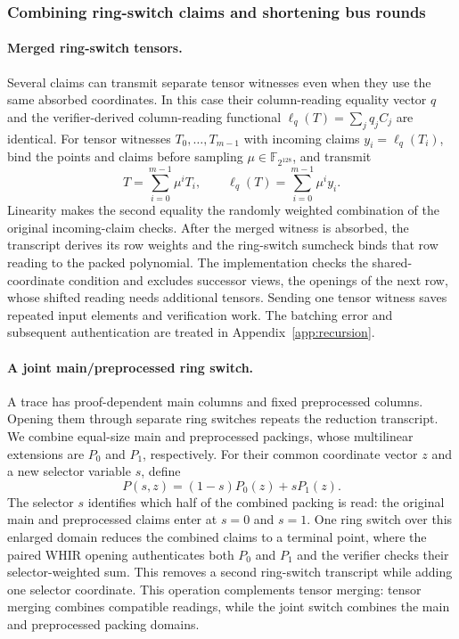 \documentclass[11pt]{article}
\newcommand{\F}{\mathbb{F}_{2^{128}}}
\begin{document}
\subsubsection{Combining ring-switch claims and shortening bus rounds}

\paragraph{Merged ring-switch tensors.} Several claims can transmit separate
tensor witnesses even when they use the same absorbed coordinates. In this
case their column-reading equality vector $q$ and the verifier-derived
column-reading functional
$\ell_q(T)=\sum_jq_jC_j$ are identical. For tensor witnesses
$T_0,\ldots,T_{m-1}$ with incoming claims $y_i=\ell_q(T_i)$, bind the
points and claims before
sampling $\mu\in\F$, and transmit
\[
  T=\sum_{i=0}^{m-1}\mu^iT_i,\qquad
  \ell_q(T)=\sum_{i=0}^{m-1}\mu^iy_i.
\]
Linearity makes the second equality the randomly weighted combination of
the original incoming-claim checks. After the merged witness is absorbed,
the transcript derives its row weights and the ring-switch sumcheck binds
that row reading to the packed polynomial. The implementation checks the
shared-coordinate condition and excludes successor views, the openings of the next row, whose shifted reading needs additional tensors. Sending one tensor
witness saves repeated input elements and verification work. The batching error and subsequent
authentication are treated in Appendix~\ref{app:recursion}.

\paragraph{A joint main/preprocessed ring switch.} A trace has
proof-dependent main columns and fixed preprocessed columns. Opening them
through separate ring switches repeats the reduction transcript. We combine
equal-size main and preprocessed packings, whose multilinear extensions are $P_0$ and
$P_1$, respectively. For their common coordinate vector $z$ and a new
selector variable $s$, define
\[
  P(s,z)=(1-s)P_0(z)+sP_1(z).
\]
The selector $s$ identifies which half of the combined packing is read:
the original main and preprocessed claims enter at $s=0$ and $s=1$.
One ring switch over this enlarged domain reduces the combined claims
to a terminal point, where the paired WHIR opening authenticates
both $P_0$ and $P_1$ and the verifier checks their selector-weighted sum.
This removes a second ring-switch transcript while adding one selector
coordinate. This operation complements tensor merging: tensor merging combines compatible readings,
while the joint switch combines the main and preprocessed packing domains.
\end{document}
